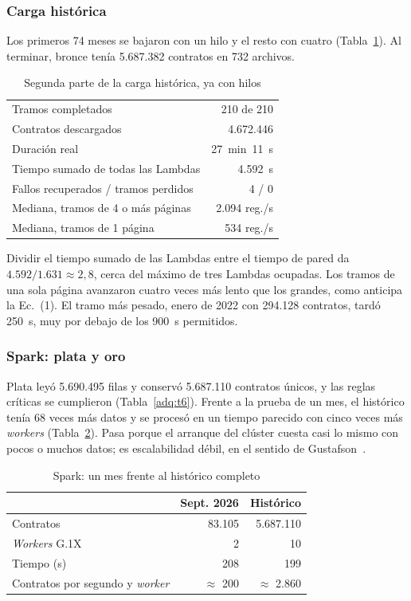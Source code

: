\subsubsection{Carga histórica}
Los primeros 74 meses se bajaron con un hilo y el resto con cuatro (Tabla~\ref{cpd:tab:fase}). Al terminar, bronce tenía 5.687.382 contratos en 732 archivos.

\begin{table}[!htbp]
\caption{Segunda parte de la carga histórica, ya con hilos}
\label{cpd:tab:fase}
\centering
\begin{tabular}{@{}lr@{}}
\toprule
Tramos completados & 210 de 210 \\
Contratos descargados & 4.672.446 \\
Duración real & 27~min~11~s \\
Tiempo sumado de todas las Lambdas & 4.592~s \\
Fallos recuperados / tramos perdidos & 4 / 0 \\
Mediana, tramos de 4 o más páginas & 2.094 reg./s \\
Mediana, tramos de 1 página & 534 reg./s \\
\bottomrule
\end{tabular}
\end{table}

Dividir el tiempo sumado de las Lambdas entre el tiempo de pared da $4.592 / 1.631 \approx 2{,}8$, cerca del máximo de tres Lambdas ocupadas. Los tramos de una sola página avanzaron cuatro veces más lento que los grandes, como anticipa la Ec.~(1). El tramo más pesado, enero de 2022 con 294.128 contratos, tardó 250~s, muy por debajo de los 900~s permitidos.

\subsubsection{Spark: plata y oro}
Plata leyó 5.690.495 filas y conservó 5.687.110 contratos únicos, y las reglas críticas se cumplieron (Tabla~\ref{adq:t6}). Frente a la prueba de un mes, el histórico tenía 68 veces más datos y se procesó en un tiempo parecido con cinco veces más \textit{workers} (Tabla~\ref{cpd:tab:debil}). Pasa porque el arranque del clúster cuesta casi lo mismo con pocos o muchos datos; es escalabilidad débil, en el sentido de Gustafson~\cite{gustafson1988}.

\begin{table}[!htbp]
\caption{Spark: un mes frente al histórico completo}
\label{cpd:tab:debil}
\centering
\begin{tabular}{@{}lrr@{}}
\toprule
 & Sept. 2026 & Histórico \\
\midrule
Contratos & 83.105 & 5.687.110 \\
\textit{Workers} G.1X & 2 & 10 \\
Tiempo (s) & 208 & 199 \\
Contratos por segundo y \textit{worker} & $\approx$ 200 & $\approx$ 2.860 \\
\bottomrule
\end{tabular}
\end{table}

